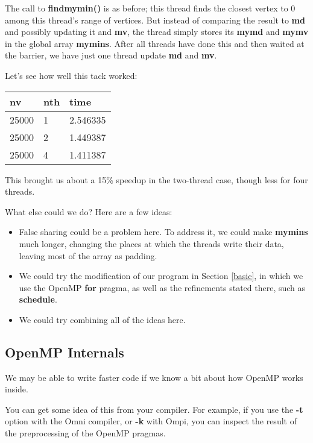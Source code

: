 The call to {\bf findmymin()} is as before; this thread finds the
closest vertex to 0 among this thread's range of vertices.  But instead
of comparing the result to {\bf md} and possibly updating it and {\bf
mv}, the thread simply stores its {\bf mymd} and {\bf mymv} in the
global array {\bf mymins}.  After all threads have done this and then
waited at the barrier, we have just one thread update {\bf md} and {\bf
mv}.

Let's see how well this tack worked:

\begin{tabular}{|l|l|l|}
\hline
nv & nth & time \\ \hline
\hline
25000 & 1 & 2.546335 \\ \hline
25000 & 2 & 1.449387 \\ \hline
25000 & 4 & 1.411387 \\ \hline
\end{tabular}

This brought us about a 15\% speedup in the two-thread case, though less
for four threads.

What else could we do?  Here are a few ideas:

\begin{itemize}

\item False sharing could be a problem here.  To address it,
we could make {\bf mymins} much longer, changing the places at
which the threads write their data, leaving most of the array as
padding.

\item We could try the modification of our program in Section
\ref{basic}, in which we use the OpenMP {\bf for} pragma, as well as the
refinements stated there, such as {\bf schedule}.

\item We could try combining all of the ideas here.

\end{itemize}

\subsection{OpenMP Internals}

We may be able to write faster code if we know a bit about how OpenMP
works inside.

You can get some idea of this from your compiler.  For example, if you
use the {\bf -t} option with the Omni compiler, or {\bf -k} with Ompi,
you can inspect the result of the preprocessing of the OpenMP pragmas.

